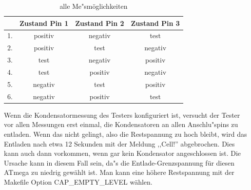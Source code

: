 \begin{table}[H]
  \begin{center}
    \begin{tabular}{| l | c | c | c |}
    \hline
      & Zustand Pin 1 & Zustand Pin 2 & Zustand Pin 3 \\
    \hline
   1. & positiv    &  negativ   &  test \\
   2. & positiv    &  test      & negativ \\
   3. & test       &  negativ   & positiv \\
   4. & test       &  positiv   & negativ \\
   5. & negativ    &  test      & positiv \\
   6. & negativ    &  positiv   &  test  \\
    \hline
    \end{tabular}
  \end{center}
  \caption{alle Me"sm\"oglichkeiten}
  \label{tab:case} 
\end{table}

Wenn die Kondensatormessung des Testers konfiguriert ist, versucht der Tester vor allen Messungen erst einmal,
die Kondensatoren an allen Anschlu"spins zu entladen. Wenn das nicht gelingt, also die Restspannung zu hoch bleibt,
wird das Entladen nach etwa 12 Sekunden mit der Meldung ,,Cell!'' abgebrochen. Dies kann auch dann vorkommen, wenn
gar kein Kondensator angeschlossen ist. Die Ursache kann in diesem Fall sein, da"s die Entlade-Grenzspannung f\"ur diesen
ATmega zu niedrig gew\"ahlt ist. Man kann eine h\"ohere Restspannung mit der Makefile Option CAP\_EMPTY\_LEVEL w\"ahlen.
